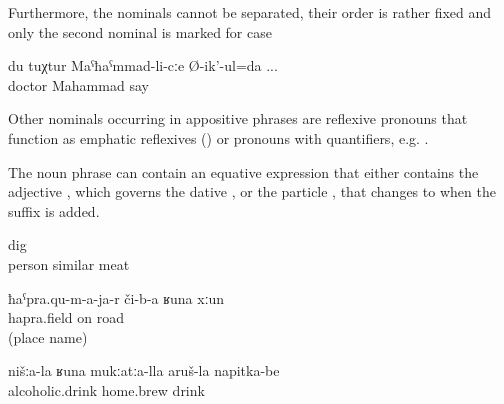 Furthermore, the nominals cannot be separated, their order is rather fixed and only the second nominal is marked for case 
%
\begin{exe}
	\ex	\label{ex:I say to Doctor Mahammad}
	\gll	du	tuχtur	Maˁħaˁmmad-li-cːe	Ø-ik'-ul=da ...\\
			doctor		Mahammad	say\\
	\glt	{}
\end{exe}

Other nominals occurring in appositive phrases are reflexive pronouns that function as emphatic reflexives () or pronouns with quantifiers, e.g.  .

The noun phrase can contain an equative expression that either contains the adjective , which governs the dative , or the particle  ,  that changes to  when the suffix  is added.
%
\begin{exe}

		\ex	\label{ex:meat similar to human (flesh)}
			dig\\
			person	similar	meat\\
		\glt	{}
		
		
		\ex	\label{ex:a road like through hapraqu@9a}
		\gll	ħaˁpra.qu-m-a-ja-r	či-b-a	ʁuna	xːun\\
			hapra.field	on		road\\
		\glt	{} (place name)

	
		\ex	\label{ex:drinks like our alcoholic homebrew}
		\gll	nišːa-la	ʁuna	mukːatːa-lla	aruš-la	napitka-be\\
					alcoholic.drink\tsc{-gen}	home.brew	drink \\
		\glt	{}

\end{exe}

